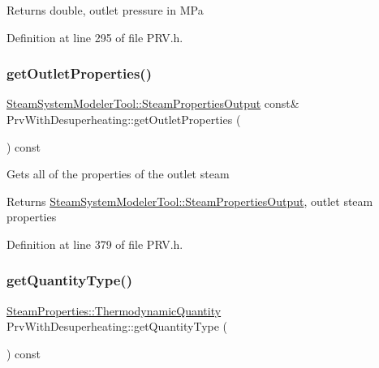 \begin{DoxyReturn}{Returns}
double, outlet pressure in M\+Pa 
\end{DoxyReturn}


Definition at line 295 of file P\+R\+V.\+h.

\mbox{\label{class_prv_with_desuperheating_a2eaa4bdad3dc9b81b2128f5c4bd2f5e8}} 
\subsubsection{\texorpdfstring{get\+Outlet\+Properties()}{getOutletProperties()}}
{\footnotesize\ttfamily \hyperlink{struct_steam_system_modeler_tool_1_1_steam_properties_output}{Steam\+System\+Modeler\+Tool\+::\+Steam\+Properties\+Output} const\& Prv\+With\+Desuperheating\+::get\+Outlet\+Properties (\begin{DoxyParamCaption}{ }\end{DoxyParamCaption}) const\hspace{0.3cm}{\ttfamily [inline]}}

Gets all of the properties of the outlet steam \begin{DoxyReturn}{Returns}
\hyperlink{struct_steam_system_modeler_tool_1_1_steam_properties_output}{Steam\+System\+Modeler\+Tool\+::\+Steam\+Properties\+Output}, outlet steam properties 
\end{DoxyReturn}


Definition at line 379 of file P\+R\+V.\+h.

\mbox{\label{class_prv_with_desuperheating_acf4609b0d63c60ccad298b8a17533ba6}} 
\subsubsection{\texorpdfstring{get\+Quantity\+Type()}{getQuantityType()}}
{\footnotesize\ttfamily \hyperlink{class_steam_properties_ae0294bedf7d178c2d8fb6aed0f62fbff}{Steam\+Properties\+::\+Thermodynamic\+Quantity} Prv\+With\+Desuperheating\+::get\+Quantity\+Type (\begin{DoxyParamCaption}{ }\end{DoxyParamCaption}) const\hspace{0.3cm}{\ttfamily [inline]}}

